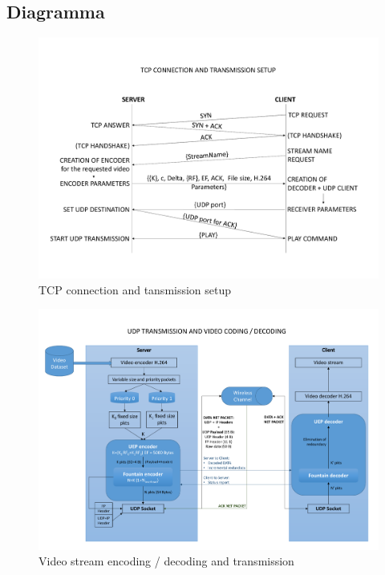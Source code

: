\documentclass[italian, a4paper, 12pt]{article}
\begin{document}
\subsection{Diagramma} %
%
\begin{figure}[H]
    \centering
        \includegraphics[clip, trim=0cm 1cm 0cm 1cm, width=1.00\textwidth]{TCP.pdf}
    \caption{TCP connection and tansmission setup}
    \label{fig:TCP}
\end{figure}
\begin{figure}[H]
    \centering
        \includegraphics[clip, trim=0cm 1cm 0cm 1cm, width=1.00\textwidth]{UDP.pdf}
    \caption{Video stream encoding / decoding and transmission}
    \label{fig:UDP}
\end{figure}
%
\newpage
\end{document}

